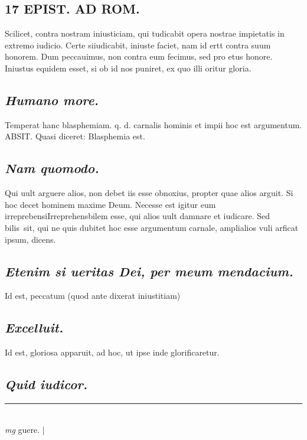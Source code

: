 \documentclass{article}
\begin{document}
\begin{pages}
\section*{17 EPIST. AD ROM.  }
\marginpar{[ p.]}\pstart Scilicet, contra nostram iniusticiam, qui tudicabit opera nostrae impietatis in extremo iudicio. Certe siiudicabit, iniuste faciet, nam id ertt contra suum honorem. Dum peccauimus, non contra eum fecimus, sed pro etus honore. Iniustus equidem esset, si ob id nos puniret, ex quo illi oritur gloria.   \pend
{}
{}
\subsection*{\textit{Humano more. }}\pstart Temperat hanc blasphemiam. q. d. carnalis hominis et impii hoc est argumentum. ABSIT.  Quasi diceret: Blasphemia est.  \pend
{}
{}
\subsection*{\textit{Nam quomodo. }}\pstart Qui uult arguere alios, non debet iis esse obnoxius, propter quae alios arguit. Si hoc decet hominem maxime Deum. Necesse est igitur eum irreprebensiIrreprehensbilem esse, qui alios uult damnare et iudicare. Sed bilis sit, qui ne quis dubitet hoc esse argumentum carnale, amplialios vuli arficat ipsum, dicens.   \pend
{}
{}
\subsection*{\textit{Etenim si ueritas Dei, per meum mendacium. }}\pstart Id est, peccatum (quod ante dixerat iniustitiam)  \pend
{}
{}
\subsection*{\textit{Excelluit. }}\pstart Id est, gloriosa apparuit, ad hoc, ut ipse inde glorificaretur.   \pend
{}
{}
\subsection*{\textit{Quid iudicor. }}\pstart  \pend
\vspace{0.5cm}\noindent
\vspace{0.2cm}\rule{1cm}{0.2pt}\\ 
\hspace{0.2cm}\textit{mg}
\footnotesize  guere.  
\normalsize| 

\end{pages}
\end{document}
